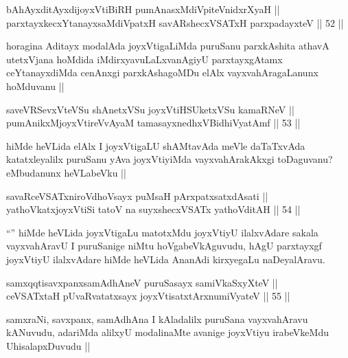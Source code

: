 
\begin{shl}
bAhAyxditAyxdijoyxVtiBiRH pumAnasxMdiVpiteVnidxrXyaH || \\
parxtayxkecxYtanayxsaMdiVpatxH savARshecxVSATxH parxpadayxteV ||  52 ||  
\end{shl}

\begin{artha}
horagina Aditayx modalAda joyxVtigaLiMda puruSanu parxkAshita athavA utetxVjana hoMdida iMdirxyavuLaLxvanAgiyU parxtayxgAtamx ceYtanayxdiMda cenAnxgi parxkAshagoMDu elAlx vayxvahAragaLanunx hoMduvanu ||
\end{artha}

\begin{shl}
saveVRSevxVteVSu shAnetxVSu joyxVtiHSUketxVSu kamaRNeV || \\
pumAnikxMjoyxVtireVvAyaM tamasayxnedhxV\s BidhiVyatAmf ||  53 ||  
\end{shl}

\begin{artha}
hiMde heVLida elAlx I joyxVtigaLU shAMtavAda meVle daTaTxvAda katatxleyalilx puruSanu yAva joyxVtiyiMda vayxvahArakAkxgi toDaguvanu? eMbudanunx heVLabeVku ||
\end{artha}


\begin{shl}
savaRceVSATxniroVdhoV\s sayx puMsaH pArxpatxsatxdA\s sati || \\
yathoVkatxjoyxVtiSi tatoV na suyxshecxVSATx yathoVditAH ||  54 ||  
\end{shl}

\begin{artha}
``\stext'' hiMde heVLida joyxVtigaLu matotxMdu joyxVtiyU ilalxvAdare sakala vayxvahAravU I puruSanige niMtu hoVgabeVkAguvudu, hAgU parxtayxgf joyxVtiyU ilalxvAdare hiMde heVLida AnanAdi kirxyegaLu naDeyalAravu.
\end{artha}

\begin{shl}
samxqqtisavxpanxsamAdhAneV puruSasayx samiVkaSxyXteV || \\
ceVSATx\s taH pUvaRvatatxsayx joyxVtisatxtArxnumiVyateV ||  55 ||  
\end{shl}

\begin{artha}
samxraNi, savxpanx, samAdhAna I kAladalilx puruSana vayxvahAravu kANuvudu, adariMda alilxyU modalinaMte avanige joyxVtiyu irabeVkeMdu UhisalapxDuvudu ||
\end{artha}

